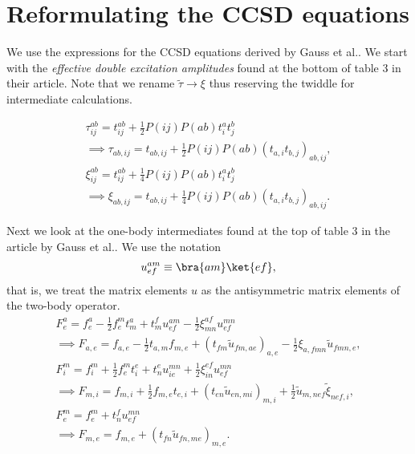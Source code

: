     \section{Reformulating the CCSD equations}
        We use the expressions for the CCSD equations derived by Gauss et
        al.\cite{gauss1995coupled}. We start with the \emph{effective double
        excitation amplitudes} found at the bottom of table 3 in their article.
        Note that we rename $\tilde{\tau} \to \xi$ thus reserving the twiddle
        for intermediate calculations.

        \begin{gather}
            \tau^{ab}_{ij} = t^{ab}_{ij}
            + \frac{1}{2}P(ij)P(ab)t^{a}_{i} t^{b}_{j}
            \\
            \implies \tau_{ab, ij} = t_{ab, ij}
            + \frac{1}{2}P(ij)P(ab)\left(t_{a, i} t_{b, j}\right)_{ab, ij},
            \\
            \xi^{ab}_{ij} = t^{ab}_{ij}
            + \frac{1}{4}P(ij)P(ab)t^{a}_{i}t^{b}_{j}
            \\
            \implies
            \xi_{ab, ij} = t_{ab, ij}
            + \frac{1}{4}P(ij)P(ab)\left(t_{a, i} t_{b, j}\right)_{ab, ij}.
        \end{gather}

        Next we look at the one-body intermediates found at the top of table 3
        in the article by Gauss et al.\cite{gauss1995coupled}. We use the
        notation
        \begin{align}
            u^{am}_{ef} \equiv \bra{am}\ket{ef},
        \end{align}
        that is, we treat the matrix elements $u$ as the antisymmetric matrix
        elements of the two-body operator.
        \begin{gather}
            F^{a}_{e} = f^{a}_{e}
            - \frac{1}{2}f^{m}_{e}t^{a}_{m}
            + t^{f}_{m}u^{am}_{ef}
            - \frac{1}{2}\xi^{af}_{mn}u^{mn}_{ef}
            \\
            \implies
            F_{a, e} = f_{a, e}
            - \frac{1}{2}t_{a, m}f_{m, e}
            + \left(t_{fm}\tilde{u}_{fm, ae}\right)_{a, e}
            - \frac{1}{2}\xi_{a, fmn}\tilde{u}_{fmn, e},
            \\
            F^{m}_{i} = f^{m}_{i} + \frac{1}{2}f^{m}_{e}t^{e}_{i}
            + t^{e}_{n}u^{mn}_{ie}
            + \frac{1}{2}\xi^{ef}_{in}u^{mn}_{ef}
            \\
            \implies
            F_{m, i} = f_{m, i}
            + \frac{1}{2}f_{m, e} t_{e, i}
            + \left(t_{en}\tilde{u}_{en, mi}\right)_{m, i}
            + \frac{1}{2}\tilde{u}_{m, nef}\tilde{\xi}_{nef, i},
            \\
            F^{m}_{e} = f^{m}_{e} + t^{f}_{n}u^{mn}_{ef}
            \\
            \implies
            F_{m, e} = f_{m, e}
            + \left(t_{fn}\tilde{u}_{fn, me}\right)_{m, e}.
        \end{gather}

